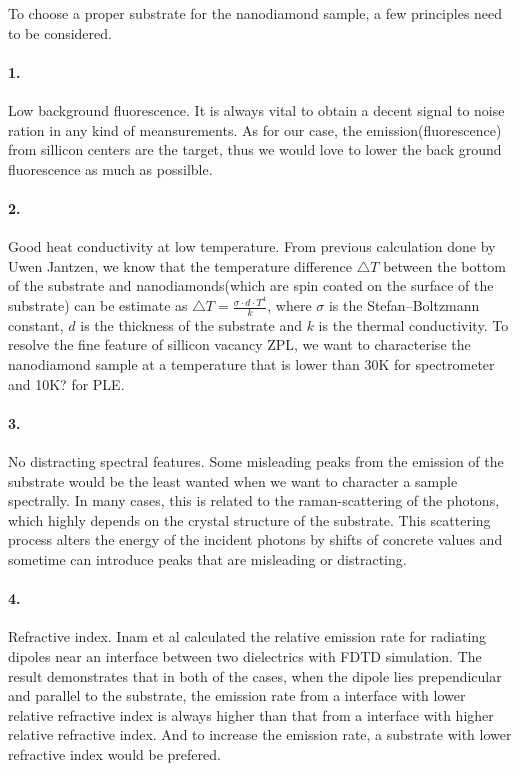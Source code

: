 To choose a proper substrate for the nanodiamond sample, a few principles need to be considered.

\paragraph{1.}Low background fluorescence. 
It is always vital to obtain a decent signal to noise ration in any kind of meansurements. As for our case, the emission(fluorescence) from sillicon centers are the target, thus we would love to lower the back ground fluorescence as much as possilble.
\paragraph{2.}Good heat conductivity at low temperature.
From previous calculation done by Uwen Jantzen, we know that the temperature difference $\bigtriangleup T$ between the bottom of the substrate and nanodiamonds(which are spin coated on the surface of the substrate) can be estimate as\newline
$\bigtriangleup T = \frac{\sigma \cdot d \cdot T^{4}}{k} $,
where $\sigma$ is the Stefan–Boltzmann constant, $d$ is the thickness of the substrate and $k$ is the thermal conductivity.
To resolve the fine feature of sillicon vacancy ZPL, we want to characterise the nanodiamond sample at a temperature that is lower than 30K for spectrometer and 10K? for PLE.
\paragraph{3.} No distracting spectral features.
Some misleading peaks from the emission of the substrate would be the least wanted when we want to character a sample spectrally. In many cases, this is related to the raman-scattering of the photons, which highly depends on the crystal structure of the substrate. This scattering process alters the energy of the incident photons by shifts of concrete values and sometime can introduce peaks that are misleading or distracting.
\paragraph{4.}Refractive index. Inam et al calculated the relative emission rate for radiating dipoles near an interface between two dielectrics with FDTD simulation. The result demonstrates that in both of the cases, when the dipole lies prependicular and parallel to the substrate, the emission rate from a interface with lower relative refractive index is always higher than that from a interface with higher relative refractive index. And to increase the emission rate, a substrate with lower refractive index would be prefered.
